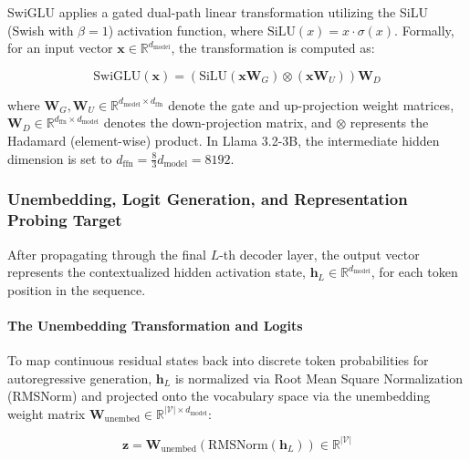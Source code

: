 \documentclass[12 pt]{article}  %
\begin{document}
SwiGLU applies a gated dual-path linear transformation utilizing the SiLU 
(Swish with $\beta=1$) activation function, where 
$\text{SiLU}(x) = x \cdot \sigma(x)$. Formally, for an input vector 
$\mathbf{x} \in \mathbb{R}^{d_{\text{model}}}$, the transformation is computed 
as:

\begin{equation}
    \text{SwiGLU}(\mathbf{x}) = 
    \left( 
        \text{SiLU}
        \left( 
            \mathbf{x} \mathbf{W}_G 
        \right) \otimes 
        \left( 
            \mathbf{x} \mathbf{W}_U 
        \right) 
    \right) \mathbf{W}_D
\end{equation}

where 
$\mathbf{W}_G, \mathbf{W}_U \in \mathbb{R}^{d_{\text{model}} \times d_{\text{ffn}}}$ 
denote the gate and up-projection weight matrices, 
$\mathbf{W}_D \in \mathbb{R}^{d_{\text{ffn}} \times d_{\text{model}}}$ 
denotes the down-projection matrix, and $\otimes$ represents the Hadamard 
(element-wise) product. In Llama 3.2-3B, the intermediate hidden dimension is 
set to $d_{\text{ffn}} = \frac{8}{3} d_{\text{model}} = 8192$.

\subsubsection{Unembedding, Logit Generation, and Representation Probing Target}

After propagating through the final $L$-th decoder layer, the output vector 
represents the contextualized hidden activation state, 
$\mathbf{h}_L \in \mathbb{R}^{d_{\text{model}}}$, for each token position in 
the sequence.

\paragraph{The Unembedding Transformation and Logits}
To map continuous residual states back into discrete token probabilities for 
autoregressive generation, $\mathbf{h}_L$ is normalized via Root Mean Square 
Normalization (RMSNorm) and projected onto the vocabulary space via the 
unembedding weight matrix 
$\mathbf{W}_{\text{unembed}} \in \mathbb{R}^{|\mathcal{V}| \times d_{\text{model}}}$:

\begin{equation}
    \mathbf{z} = \mathbf{W}_{\text{unembed}} 
    \left( 
        \text{RMSNorm}(\mathbf{h}_L) 
    \right) \in \mathbb{R}^{|\mathcal{V}|}
\end{equation}
\end{document}
